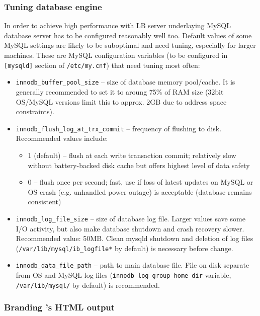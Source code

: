 \subsubsection{Tuning database engine}
\label{inst:db_tuning}

In order to achieve high performance with LB server underlaying MySQL 
database server has to be configured reasonably well too. 
Default values of some MySQL settings are likely to be suboptimal
and need tuning, especially for larger machines.
These are MySQL configuration variables (to be configured in \texttt{[mysqld]} 
section of \texttt{/etc/my.cnf}) that need tuning most often:
\begin{itemize}
\item \texttt{innodb\_buffer\_pool\_size} -- size of database memory pool/cache. 
It is generally recommended to set it to aroung 75\% of RAM size
(32bit OS/MySQL versions limit this to approx. 2GB due to address space 
constraints).

\item \texttt{innodb\_flush\_log\_at\_trx\_commit} -- frequency of flushing to disk.
Recommended values include:
\begin{itemize}
\item 1 (default) -- flush at each write transaction commit; relatively
slow without battery-backed disk cache but offers highest level of data safety
\item 0 -- flush once per second; fast, use if loss of latest updates on MySQL
or OS crash (e.g. unhandled power outage) is acceptable (database remains consistent)
\end{itemize}

\item \texttt{innodb\_log\_file\_size} -- size of database log file. Larger values
save some I/O activity, but also make database shutdown and crash recovery slower.
Recommended value: 50MB. Clean mysqld shutdown and deletion of log files 
(\texttt{/var/lib/mysql/ib\_logfile*} by default) is necessary before change.

\item \texttt{innodb\_data\_file\_path} -- path to main database file. File on
disk separate from OS and MySQL log files (\texttt{innodb\_log\_group\_home\_dir} variable,
\texttt{/var/lib/mysql/} by default) is recommended.

\end{itemize}

\subsubsection{Branding \LB's HTML output}
\label{inst:branding}

